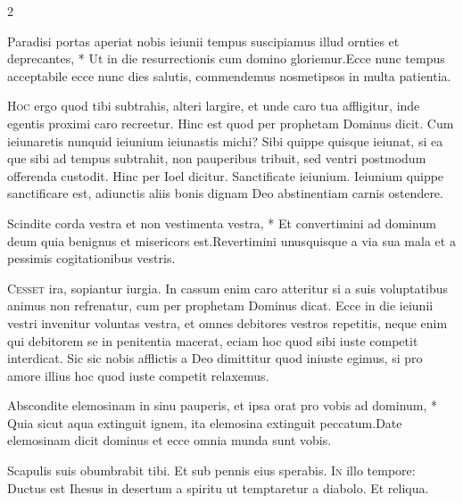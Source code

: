 \begin{multicols*}{2}
\begin{responsory}
{Paradisi portas aperiat nobis ieiunii tempus suscipiamus illud ornties et deprecantes, * Ut in die resurrectionis cum domino gloriemur.}{Ecce nunc tempus acceptabile ecce nunc dies salutis, commendemus nosmetipsos in multa patientia.}
\end{responsory}%
\lettrine[lines=2]{\zallmancaps \color{Red} H}{oc} ergo quod tibi subtrahis, alteri largire, et unde caro tua affligitur, inde egentis proximi caro recreetur. Hinc est quod per prophetam Dominus dicit. Cum ieiunaretis nunquid ieiunium ieiunastis michi? Sibi quippe quisque ieiunat, si ea que sibi ad tempus subtrahit, non pauperibus tribuit, sed ventri postmodum offerenda custodit. Hinc per Ioel dicitur. Sanctificate ieiunium. Ieiunium quippe sanctificare est, adiunctis aliis bonis dignam Deo abstinentiam carnis ostendere.
\begin{responsory}
{Scindite corda vestra et non vestimenta vestra, * Et convertimini ad dominum deum quia benignus et misericors est.}{Revertimini unusquisque a via sua mala et a pessimis cogitationibus vestris.}
\end{responsory}%
\lettrine[lines=2]{\zallmancaps \color{Blue} C}{esset} ira, sopiantur iurgia. In cassum enim caro atteritur si a suis voluptatibus animus non refrenatur, cum per prophetam Dominus dicat. Ecce in die ieiunii vestri invenitur voluntas vestra, et omnes debitores vestros repetitis, neque enim qui debitorem se in penitentia macerat, eciam hoc quod sibi iuste competit interdicat. Sic sic nobis afflictis a Deo dimittitur quod iniuste egimus, si pro amore illius hoc quod iuste competit relaxemus.
\begin{responsory-doxology}
{Abscondite elemosinam in sinu pauperis, et ipsa orat pro vobis ad dominum, * Quia sicut aqua extinguit ignem, ita elemosina extinguit peccatum.}{Date elemosinam dicit dominus et ecce omnia munda sunt vobis.}
\end{responsory-doxology}%
 \V Scapulis suis obumbrabit tibi. \R Et sub pennis eius sperabis.
\lettrine[lines=2]{\zallmancaps \color{Red} I}{n} illo tempore: Ductus est Ihesus in desertum a spiritu ut temptaretur a diabolo. Et reliqua.

\end{multicols*}
